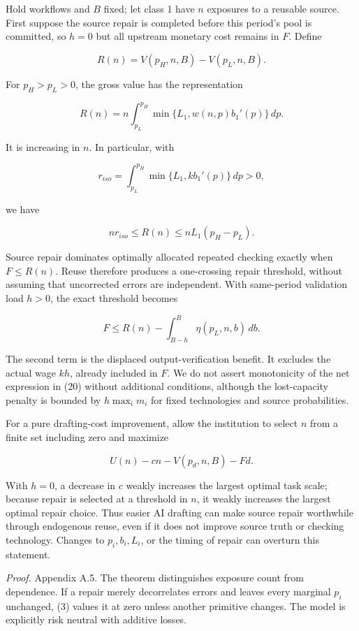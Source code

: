 \documentclass[
  11pt,
  a4paper,
]{article}
\begin{document}
Hold workflows and \(B\) fixed; let class 1 have \(n\) exposures to a
reusable source. First suppose the source repair is completed before
this period's pool is committed, so \(h=0\) but all upstream monetary
cost remains in \(F\). Define

\[R(n)=V(p_H,n,B)-V(p_L,n,B).\]

For \(p_H>p_L>0\), the gross value has the representation

\[R(n)=n\int_{p_L}^{p_H}\min\{L_1,w(n,p)b_1'(p)\}\,dp. \tag{18}\]

It is increasing in \(n\). In particular, with

\[r_{iso}=\int_{p_L}^{p_H}\min\{L_1,kb_1'(p)\}\,dp>0,\]

we have

\[n r_{iso}\leq R(n)\leq nL_1(p_H-p_L). \tag{19}\]

Source repair dominates optimally allocated repeated checking exactly
when \(F\leq R(n)\). Reuse therefore produces a one-crossing repair
threshold, without assuming that uncorrected errors are independent.
With same-period validation load \(h>0\), the exact threshold becomes

\[F\leq R(n)-\int_{B-h}^{B}\eta(p_L,n,b)\,db. \tag{20}\]

The second term is the displaced output-verification benefit. It
excludes the actual wage \(kh\), already included in \(F\). We do not
assert monotonicity of the net expression in (20) without additional
conditions, although the lost-capacity penalty is bounded by
\(h\max_i m_i\) for fixed technologies and source probabilities.

For a pure drafting-cost improvement, allow the institution to select
\(n\) from a finite set including zero and maximize

\[U(n)-c n-V(p_d,n,B)-Fd. \tag{21}\]

With \(h=0\), a decrease in \(c\) weakly increases the largest optimal
task scale; because repair is selected at a threshold in \(n\), it
weakly increases the largest optimal repair choice. Thus easier AI
drafting can make source repair worthwhile through endogenous reuse,
even if it does not improve source truth or checking technology. Changes
to \(p_i,b_i,L_i\), or the timing of repair can overturn this statement.

\emph{Proof.} Appendix A.5. The theorem distinguishes exposure count
from dependence. If a repair merely decorrelates errors and leaves every
marginal \(p_i\) unchanged, (3) values it at zero unless another
primitive changes. The model is explicitly risk neutral with additive
losses.
\end{document}
